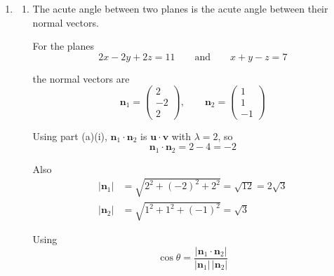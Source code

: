 \documentclass[leqno]{article}
\begin{document}
\begin{enumerate}[
  label=\textbf{\arabic*.},
  leftmargin=*,
  topsep=0pt,
  partopsep=0pt,
  parsep=0pt
]
\begin{djsSolution}
\begin{enumerate}[label=\textbf{(\alph*)}]
\begin{enumerate}[label=(\roman*)]
    \item
    \begin{align*}
    \mathbf{u}\times\mathbf{v}
    &=
    \begin{vmatrix}
    \mathbf{i} & \mathbf{j} & \mathbf{k}\\
    \lambda & -2 & 2\\
    1 & 1 & -1
    \end{vmatrix}\\
    &=
    \mathbf{i}\bigl((-2)(-1)-2(1)\bigr)
    -\mathbf{j}\bigl(\lambda(-1)-2(1)\bigr)
    +\mathbf{k}\bigl(\lambda(1)-(-2)(1)\bigr)\\
    &=
    (\lambda+2)\mathbf{j}+(\lambda+2)\mathbf{k}\\
    &=
    (\lambda+2)(\mathbf{j}+\mathbf{k})
    \end{align*}
  \end{enumerate}

  \item
  \begin{enumerate}[label=(\roman*)]
    \item
    The acute angle between two planes is the acute angle between their normal vectors.

    For the planes
    \[
    2x-2y+2z=11
    \qquad\text{and}\qquad
    x+y-z=7
    \]

    the normal vectors are
    \[
    \mathbf{n}_1=\begin{pmatrix}2\\-2\\2\end{pmatrix},
    \qquad
    \mathbf{n}_2=\begin{pmatrix}1\\1\\-1\end{pmatrix}
    \]

    Using part (a)(i), \(\mathbf{n}_1\cdot\mathbf{n}_2\) is \(\mathbf{u}\cdot\mathbf{v}\) with \(\lambda=2\), so
    \[
    \mathbf{n}_1\cdot\mathbf{n}_2=2-4=-2
    \]

    Also
    \begin{align*}
    \left\lvert\mathbf{n}_1\right\rvert
    &=\sqrt{2^2+(-2)^2+2^2}
    =\sqrt{12}
    =2\sqrt{3}\\
    \left\lvert\mathbf{n}_2\right\rvert
    &=\sqrt{1^2+1^2+(-1)^2}
    =\sqrt{3}
    \end{align*}

    Using
    \[
    \cos\theta
    =
    \frac{\left\lvert\mathbf{n}_1\cdot\mathbf{n}_2\right\rvert}
    {\left\lvert\mathbf{n}_1\right\rvert\,\left\lvert\mathbf{n}_2\right\rvert}
    \]


\end{enumerate}
\end{enumerate}
\end{djsSolution}
\end{enumerate}
\end{document}
